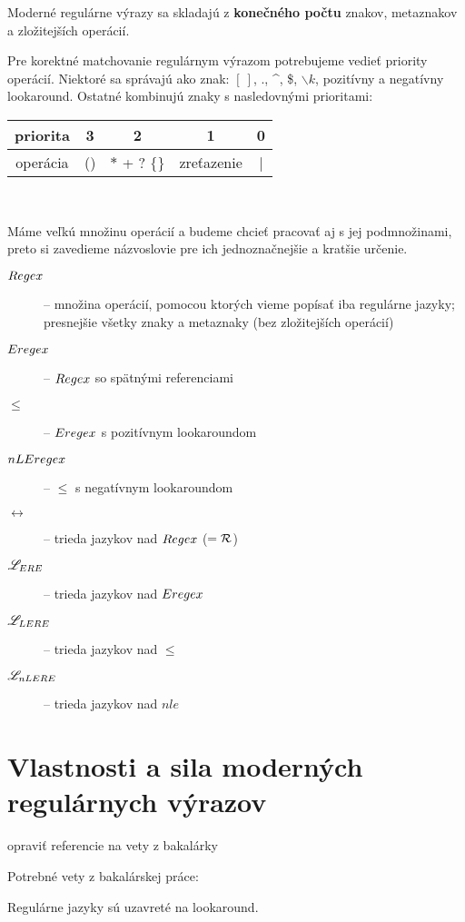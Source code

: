 Moderné regulárne výrazy sa skladajú z \textbf{konečného počtu} znakov, metaznakov a zložitejších operácií.

Pre korektné matchovanie regulárnym výrazom potrebujeme vedieť priority operácií. Niektoré sa správajú ako znak: $\left[~\right]$, ., \textasciicircum, \$, $\backslash k$, pozitívny a negatívny lookaround. Ostatné kombinujú znaky s nasledovnými prioritami:

\begin{tabular}{|c||c|c|c|c|}
\hline
priorita &3&2&1& 0  \\
\hline
operácia & () & $*$ + ? $\lbrace \rbrace$ & zreťazenie & | \\ \hline
\end{tabular}
\\ \par
Máme veľkú množinu operácií a budeme chcieť pracovať aj s jej podmnožinami, preto si zavedieme názvoslovie pre ich jednoznačnejšie a kratšie určenie.

\begin{description}
\item[$Regex$] -- množina operácií, pomocou ktorých vieme popísať iba regulárne jazyky; presnejšie všetky znaky a metaznaky (bez zložitejších operácií)
\item[$Eregex$] -- $Regex$ so spätnými referenciami
\item[$\le$] -- $Eregex$ s pozitívnym lookaroundom
\item[$nLEregex$] -- $\le$ s negatívnym lookaroundom
\item[$\rel$] -- trieda jazykov nad $Regex$ ($= {\cal R}$)
\item[$\mathscr{L}_{ERE}$] -- trieda jazykov nad $Eregex$
\item[$\mathscr{L}_{LERE}$] -- trieda jazykov nad $\le$
\item[$\mathscr{L}_{nLERE}$] -- trieda jazykov nad $nle$
\end{description}

\section[Vlastnosti a sila]{Vlastnosti a sila moderných regulárnych výrazov}
\label{usila}

\todo opraviť referencie na vety z bakalárky

Potrebné vety z bakalárskej práce:

\begin{veta}[Veta 2.2.5.]\label{lookahead+R}
Regulárne jazyky sú uzavreté na lookaround.
\end{veta}

